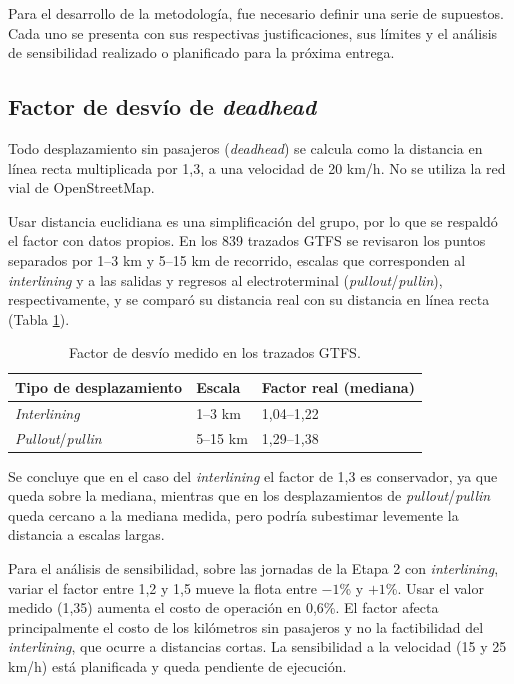 Para el desarrollo de la metodología, fue necesario definir una serie de supuestos. Cada uno se presenta con sus respectivas justificaciones, sus límites y el análisis de sensibilidad realizado o planificado para la próxima entrega.

\subsection{Factor de desvío de \textit{deadhead}}
\label{sup:desvio}

Todo desplazamiento sin pasajeros (\textit{deadhead}) se calcula como la distancia en línea recta multiplicada por 1,3, a una velocidad de 20 km/h. No se utiliza la red vial de OpenStreetMap.

Usar distancia euclidiana es una simplificación del grupo, por lo que se respaldó el factor con datos propios. En los 839 trazados GTFS se revisaron los puntos separados por 1--3 km y 5--15 km de recorrido, escalas que corresponden al \textit{interlining} y a las salidas y regresos al electroterminal (\textit{pullout}/\textit{pullin}), respectivamente, y se comparó su distancia real con su distancia en línea recta (Tabla \ref{tab:factor-desvio}).

\begin{table}[H]
\centering
\small
\begin{tabular}{lll}
\toprule
Tipo de desplazamiento & Escala & Factor real (mediana) \\
\midrule
\textit{Interlining} & 1--3 km & 1,04--1,22 \\
\textit{Pullout}/\textit{pullin} & 5--15 km & 1,29--1,38 \\
\bottomrule
\end{tabular}
\caption{Factor de desvío medido en los trazados GTFS.}
\label{tab:factor-desvio}
\end{table}

Se concluye que en el caso del \textit{interlining} el factor de 1,3 es conservador, ya que queda sobre la mediana, mientras que en los desplazamientos de \textit{pullout}/\textit{pullin} queda cercano a la mediana medida, pero podría subestimar levemente la distancia a escalas largas.

Para el análisis de sensibilidad, sobre las jornadas de la Etapa 2 con \textit{interlining}, variar el factor entre 1,2 y 1,5 mueve la flota entre $-1$\% y $+1$\%. Usar el valor medido (1,35) aumenta el costo de operación en 0,6\%. El factor afecta principalmente el costo de los kilómetros sin pasajeros y no la factibilidad del \textit{interlining}, que ocurre a distancias cortas. La sensibilidad a la velocidad (15 y 25 km/h) está planificada y queda pendiente de ejecución.


